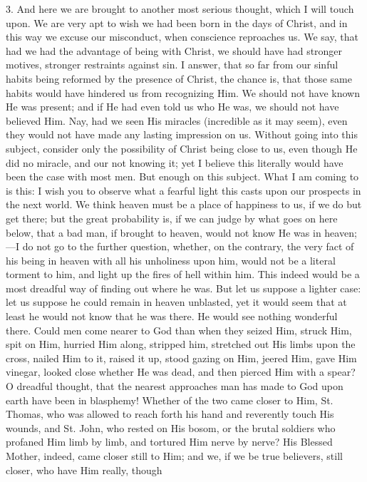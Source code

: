3. And here we are brought to another most serious thought, which I
will touch upon. We are very apt to wish we had been born in the days
of Christ, and in this way we excuse our misconduct, when conscience
reproaches us. We say, that had we had the advantage of being with
Christ, we should have had stronger motives, stronger restraints
against sin. I answer, that so far from our sinful habits being
reformed by the presence of Christ, the chance is, that those same
habits would have hindered us from recognizing Him. We should not have
known He was present; and if He had even told us who He was, we should
not have believed Him. Nay, had we seen His miracles (incredible as it
may seem), even they would not have made any lasting impression on us.
Without going into this subject, consider only the possibility of
Christ being close to us, even though He did no miracle, and our not
knowing it; yet I believe this literally would have been the case with
most men. But enough on this subject. What I am coming to is this: I
wish you to observe what a fearful light this casts upon our prospects
in the next world. We think heaven must be a place of happiness to us,
if we do but get there; but the great probability is, if we can judge
by what goes on here below, that a bad man, if brought to heaven,
would not know He was in heaven;—I do not go to the further question,
whether, on the contrary, the very fact of his being in heaven with
all his unholiness upon him, would not be a literal torment to him,
and light up the fires of hell within him. This indeed would be a most
dreadful way of finding out where he was. But let us suppose a lighter
case: let us suppose he could remain in heaven unblasted, yet it would
seem that at least he would not know that he was there. He would see
nothing wonderful there. Could men come nearer to God than when they
seized Him, struck Him, spit on Him, hurried Him along, stripped him,
stretched out His limbs upon the cross, nailed Him to it, raised it
up, stood gazing on Him, jeered Him, gave Him vinegar, looked close
whether He was dead, and then pierced Him with a spear? O dreadful
thought, that the nearest approaches man has made to God upon earth
have been in blasphemy! Whether of the two came closer to Him, St.
Thomas, who was allowed to reach forth his hand and reverently touch
His wounds, and St. John, who rested on His bosom, or the brutal
soldiers who profaned Him limb by limb, and tortured Him nerve by
nerve? His Blessed Mother, indeed, came closer still to Him; and we,
if we be true believers, still closer, who have Him really, though
